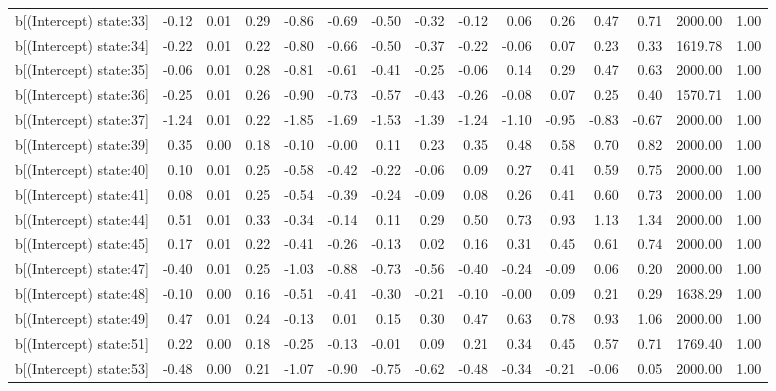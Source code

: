\begin{table}[ht]
\begin{tabular}{rrrrrrrrrrrrrrr}
  b[(Intercept) state:33] & -0.12 & 0.01 & 0.29 & -0.86 & -0.69 & -0.50 & -0.32 & -0.12 & 0.06 & 0.26 & 0.47 & 0.71 & 2000.00 & 1.00 \\ 
  b[(Intercept) state:34] & -0.22 & 0.01 & 0.22 & -0.80 & -0.66 & -0.50 & -0.37 & -0.22 & -0.06 & 0.07 & 0.23 & 0.33 & 1619.78 & 1.00 \\ 
  b[(Intercept) state:35] & -0.06 & 0.01 & 0.28 & -0.81 & -0.61 & -0.41 & -0.25 & -0.06 & 0.14 & 0.29 & 0.47 & 0.63 & 2000.00 & 1.00 \\ 
  b[(Intercept) state:36] & -0.25 & 0.01 & 0.26 & -0.90 & -0.73 & -0.57 & -0.43 & -0.26 & -0.08 & 0.07 & 0.25 & 0.40 & 1570.71 & 1.00 \\ 
  b[(Intercept) state:37] & -1.24 & 0.01 & 0.22 & -1.85 & -1.69 & -1.53 & -1.39 & -1.24 & -1.10 & -0.95 & -0.83 & -0.67 & 2000.00 & 1.00 \\ 
  b[(Intercept) state:39] & 0.35 & 0.00 & 0.18 & -0.10 & -0.00 & 0.11 & 0.23 & 0.35 & 0.48 & 0.58 & 0.70 & 0.82 & 2000.00 & 1.00 \\ 
  b[(Intercept) state:40] & 0.10 & 0.01 & 0.25 & -0.58 & -0.42 & -0.22 & -0.06 & 0.09 & 0.27 & 0.41 & 0.59 & 0.75 & 2000.00 & 1.00 \\ 
  b[(Intercept) state:41] & 0.08 & 0.01 & 0.25 & -0.54 & -0.39 & -0.24 & -0.09 & 0.08 & 0.26 & 0.41 & 0.60 & 0.73 & 2000.00 & 1.00 \\ 
  b[(Intercept) state:44] & 0.51 & 0.01 & 0.33 & -0.34 & -0.14 & 0.11 & 0.29 & 0.50 & 0.73 & 0.93 & 1.13 & 1.34 & 2000.00 & 1.00 \\ 
  b[(Intercept) state:45] & 0.17 & 0.01 & 0.22 & -0.41 & -0.26 & -0.13 & 0.02 & 0.16 & 0.31 & 0.45 & 0.61 & 0.74 & 2000.00 & 1.00 \\ 
  b[(Intercept) state:47] & -0.40 & 0.01 & 0.25 & -1.03 & -0.88 & -0.73 & -0.56 & -0.40 & -0.24 & -0.09 & 0.06 & 0.20 & 2000.00 & 1.00 \\ 
  b[(Intercept) state:48] & -0.10 & 0.00 & 0.16 & -0.51 & -0.41 & -0.30 & -0.21 & -0.10 & -0.00 & 0.09 & 0.21 & 0.29 & 1638.29 & 1.00 \\ 
  b[(Intercept) state:49] & 0.47 & 0.01 & 0.24 & -0.13 & 0.01 & 0.15 & 0.30 & 0.47 & 0.63 & 0.78 & 0.93 & 1.06 & 2000.00 & 1.00 \\ 
  b[(Intercept) state:51] & 0.22 & 0.00 & 0.18 & -0.25 & -0.13 & -0.01 & 0.09 & 0.21 & 0.34 & 0.45 & 0.57 & 0.71 & 1769.40 & 1.00 \\ 
  b[(Intercept) state:53] & -0.48 & 0.00 & 0.21 & -1.07 & -0.90 & -0.75 & -0.62 & -0.48 & -0.34 & -0.21 & -0.06 & 0.05 & 2000.00 & 1.00 \\ 

\end{tabular}
\end{table}
